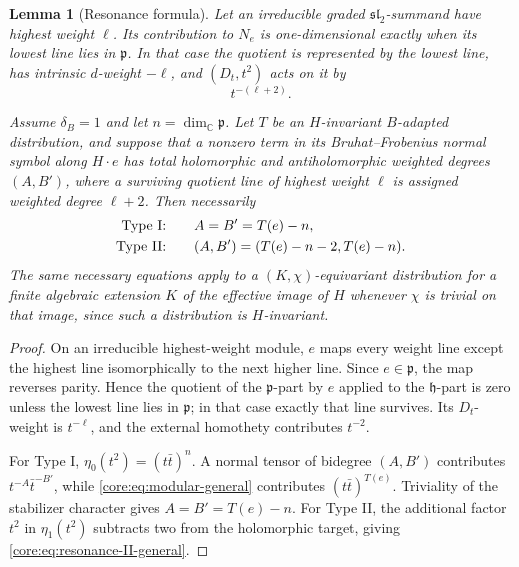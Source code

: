 \documentclass[11pt,reqno]{amsart}
\numberwithin{equation}{section}
\newtheorem{lemma}[theorem]{Lemma}
\theoremstyle{definition}
\theoremstyle{remark}
\newcommand{\C}{\mathbb C}
\newcommand{\fh}{\mathfrak h}
\newcommand{\fp}{\mathfrak p}
\begin{document}
\begin{lemma}[Resonance formula]\label{core:lem:resonance-general}
Let an irreducible graded $\mathfrak{sl}_2$-summand have highest weight
$\ell$.  Its contribution to $N_e$ is one-dimensional exactly when its lowest
line lies in $\fp$.  In that case the quotient is represented by the lowest
line, has intrinsic $d$-weight $-\ell$, and $(D_t,t^2)$ acts on it by
\begin{equation}\label{core:eq:elementary-degree-general}
 t^{-(\ell+2)}.
\end{equation}

Assume $\delta_B=1$ and let $n=\dim_{\C}\fp$.  Let $T$ be an
$H$-invariant $B$-adapted distribution, and suppose that a nonzero term in its
Bruhat--Frobenius normal symbol along $H\cdot e$ has total holomorphic and
antiholomorphic weighted degrees $(A,B')$, where a surviving quotient line of
highest weight $\ell$ is assigned weighted degree $\ell+2$.  Then necessarily
\begin{align}
 \textup{Type I:}&\qquad A=B'=T(e)-n,\label{core:eq:resonance-I-general}\\
 \textup{Type II:}&\qquad (A,B')=(T(e)-n-2,T(e)-n).
 \label{core:eq:resonance-II-general}
\end{align}
The same necessary equations apply to a $(K,\chi)$-equivariant distribution
for a finite algebraic extension $K$ of the effective image of $H$ whenever
$\chi$ is trivial on that image, since such a distribution is $H$-invariant.
\end{lemma}

\begin{proof}
On an irreducible highest-weight module, $e$ maps every weight line except the
highest line isomorphically to the next higher line.  Since $e\in\fp$, the map
reverses parity.  Hence the quotient of the $\fp$-part by $e$ applied to the
$\fh$-part is zero unless the lowest line lies in $\fp$; in that case exactly
that line survives.  Its $D_t$-weight is $t^{-\ell}$, and the external
homothety contributes $t^{-2}$.

For Type I,
$\eta_0(t^2)=(t\bar t)^n$.  A normal tensor of bidegree $(A,B')$ contributes
$t^{-A}\bar t^{-B'}$, while \eqref{core:eq:modular-general} contributes
$(t\bar t)^{T(e)}$.  Triviality of the stabilizer character gives
$A=B'=T(e)-n$.  For Type II, the additional factor $t^2$ in
$\eta_1(t^2)$ subtracts two from the holomorphic target, giving
\eqref{core:eq:resonance-II-general}.
\end{proof}
\end{document}
